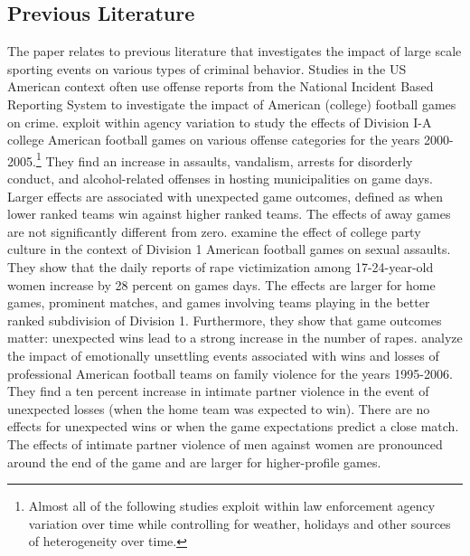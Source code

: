 \subsection{Previous Literature}
The paper relates to previous literature that investigates the impact of large scale sporting events on various types of criminal behavior. Studies in the US American context often use offense reports from the National Incident Based Reporting System to investigate the impact of American (college) football games on crime. \cite{rees2009college} exploit within agency variation to study the effects of Division I-A college American football games on various offense categories for the years 2000-2005.\footnote{Almost all of the following studies exploit within law enforcement agency variation over time while controlling for weather, holidays and other sources of heterogeneity over time.} They find an increase in assaults, vandalism, arrests for disorderly conduct, and alcohol-related offenses in hosting municipalities on game days. Larger effects are associated with unexpected game outcomes, defined as when lower ranked teams win against higher ranked teams. The effects of away games are not significantly different from zero. \cite{lindo2018college} examine the effect of college party culture in the context of Division 1 American football games on sexual assaults. They show that the daily reports of rape victimization among 17-24-year-old women increase by 28 percent on games days. The effects are larger for home games, prominent matches, and games involving teams playing in the better ranked subdivision of Division 1. Furthermore, they show that game outcomes matter: unexpected wins lead to a strong increase in the number of rapes. \cite{card2011family} analyze the impact of emotionally unsettling events associated with wins and losses of professional American football teams on family violence for the years 1995-2006. They find a ten percent increase in intimate partner violence in the event of unexpected losses (when the home team was expected to win). There are no effects for unexpected wins or when the game expectations predict a close match. The effects of intimate partner violence of men against women are pronounced around the end of the game and are larger for higher-profile games. 

